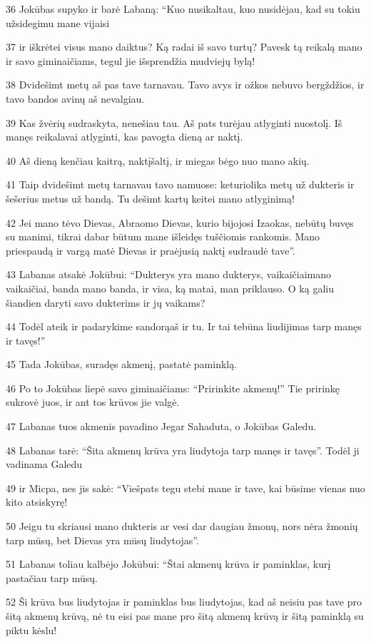 \par 36 Jokūbas supyko ir barė Labaną: “Kuo nusikaltau, kuo nusidėjau, kad su tokiu užsidegimu mane vijaisi 
\par 37 ir iškrėtei visus mano daiktus? Ką radai iš savo turtų? Pavesk tą reikalą mano ir savo giminaičiams, tegul jie išsprendžia mudviejų bylą! 
\par 38 Dvidešimt metų aš pas tave tarnavau. Tavo avys ir ožkos nebuvo bergždžios, ir tavo bandos avinų aš nevalgiau. 
\par 39 Kas žvėrių sudraskyta, nenešiau tau. Aš pats turėjau atlyginti nuostolį. Iš manęs reikalavai atlyginti, kas pavogta dieną ar naktį. 
\par 40 Aš dieną kenčiau kaitrą, naktį­šaltį, ir miegas bėgo nuo mano akių. 
\par 41 Taip dvidešimt metų tarnavau tavo namuose: keturiolika metų už dukteris ir šešerius metus už bandą. Tu dešimt kartų keitei mano atlyginimą! 
\par 42 Jei mano tėvo Dievas, Abraomo Dievas, kurio bijojosi Izaokas, nebūtų buvęs su manimi, tikrai dabar būtum mane išleidęs tuščiomis rankomis. Mano priespaudą ir vargą matė Dievas ir praėjusią naktį sudraudė tave”. 
\par 43 Labanas atsakė Jokūbui: “Dukterys yra mano dukterys, vaikaičiai­mano vaikaičiai, banda­ mano banda, ir visa, ką matai, man priklauso. O ką galiu šiandien daryti savo dukterims ir jų vaikams? 
\par 44 Todėl ateik ir padarykime sandorą­aš ir tu. Ir tai tebūna liudijimas tarp manęs ir tavęs!” 
\par 45 Tada Jokūbas, suradęs akmenį, pastatė paminklą. 
\par 46 Po to Jokūbas liepė savo giminaičiams: “Pririnkite akmenų!” Tie pririnkę sukrovė juos, ir ant tos krūvos jie valgė. 
\par 47 Labanas tuos akmenis pavadino Jegar Sahaduta, o Jokūbas­ Galedu. 
\par 48 Labanas tarė: “Šita akmenų krūva yra liudytoja tarp manęs ir tavęs”. Todėl ji vadinama Galedu 
\par 49 ir Micpa, nes jis sakė: “Viešpats tegu stebi mane ir tave, kai būsime vienas nuo kito atsiskyrę! 
\par 50 Jeigu tu skriausi mano dukteris ar vesi dar daugiau žmonų, nors nėra žmonių tarp mūsų, bet Dievas yra mūsų liudytojas”. 
\par 51 Labanas toliau kalbėjo Jokūbui: “Štai akmenų krūva ir paminklas, kurį pastačiau tarp mūsų. 
\par 52 Ši krūva bus liudytojas ir paminklas bus liudytojas, kad aš neisiu pas tave pro šitą akmenų krūvą, nė tu eisi pas mane pro šitą akmenų krūvą ir šitą paminklą su piktu kėslu! 
